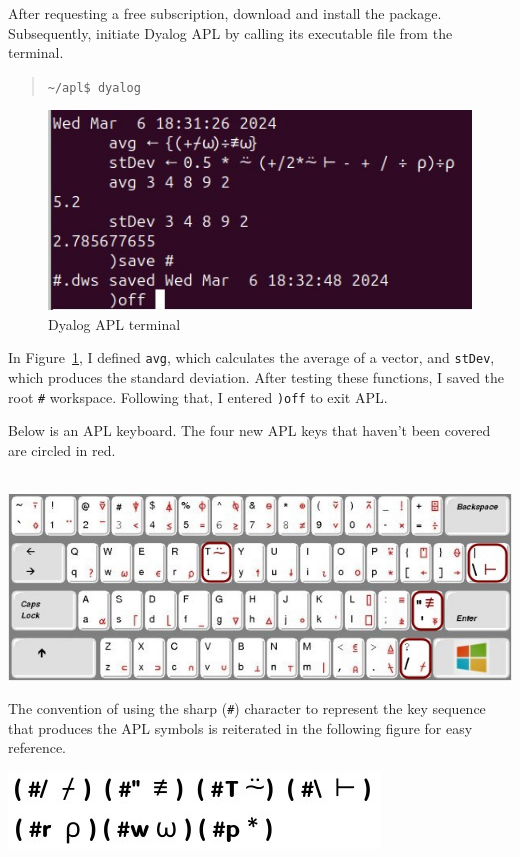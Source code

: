 \documentclass[a4paper,12pt]{book}
\begin{document}
After requesting a free subscription,
download and install the package.
Subsequently, initiate Dyalog APL by calling
its executable file from the terminal.
\begin{quote}
\verb|~/apl$ dyalog|
\end{quote}
\begin{figure}[!h]
\includegraphics{figs/dyalog-save-ws.jpg}
\caption{Dyalog APL terminal}
\label{fig:dyalog-save-ws}
\end{figure}

In Figure~\ref{fig:dyalog-save-ws}, I defined
 \verb|avg|, which calculates the
average of a vector, and \verb|stDev|, which
produces the standard deviation. After testing
these functions, I saved the root \verb|#| workspace.
Following that, I entered \verb|)off| to exit APL.

\newpage
Below is an APL keyboard. The four new APL
keys that haven't been covered are circled in red.

\verb||\\
\hspace*{-0.5cm}
\includegraphics{figs/apl-aspas-barra-T.jpg}

The convention of using the sharp (\verb|#|)
character to represent the key sequence that
produces the APL symbols is reiterated in the
following figure for easy reference.

\includegraphics{figs/sharp-trwp.jpg}
\end{document}
